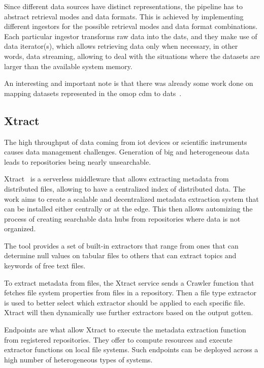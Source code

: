 Since different data sources have distinct representations, the pipeline has to abstract retrieval modes and data formats.
This is achieved by implementing different ingestors for the possible retrieval modes and data format combinations.
Each particular ingestor transforms raw data into the \gls{dats}, and they make use of data iterator(s), which allows retrieving data only when necessary, in other words, data streaming, allowing to deal with the situations where the datasets are larger than the available system memory.

An interesting and important note is that there was already some work done on mapping datasets represented in the \gls{omop} \gls{cdm} to \gls{dats}~\cite{cdm-dats}.

\subsection*{Xtract}
The high throughput of data coming from \gls{iot} devices or scientific instruments causes data management challenges.
Generation of big and heterogeneous data leads to repositories being nearly unsearchable.

Xtract~\cite{xtract} is a serverless middleware that allows extracting metadata from distributed files, allowing to have a centralized index of distributed data.
The work aims to create a scalable and decentralized metadata extraction system that can be installed either centrally or at the edge.
This then allows automizing the process of creating searchable data hubs from repositories where data is not organized.

The tool provides a set of built-in extractors that range from ones that can determine null values on tabular files to others that can extract topics and keywords of free text files.

To extract metadata from files, the Xtract service sends a Crawler function that fetches file system properties from files in a repository.
Then a file type extractor is used to better select which extractor should be applied to each specific file.
Xtract will then dynamically use further extractors based on the output gotten.

Endpoints are what allow Xtract to execute the metadata extraction function from registered repositories.
They offer to compute resources and execute extractor functions on local file systems.
Such endpoints can be deployed across a high number of heterogeneous types of systems.


